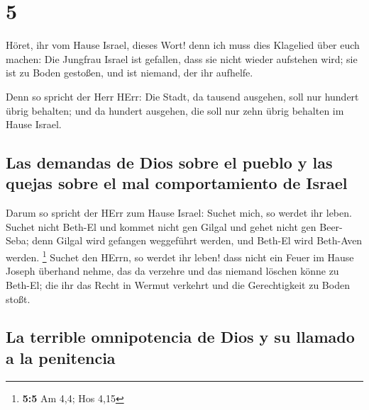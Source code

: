 \hypertarget{section-4}{%
\section{5}\label{section-4}}

 Höret, ihr vom Hause Israel, dieses Wort! denn ich muss
dies Klagelied über euch machen:  Die Jungfrau Israel ist
gefallen, dass sie nicht wieder aufstehen wird; sie ist zu Boden
gestoßen, und ist niemand, der ihr aufhelfe.

 Denn so spricht der Herr HErr: Die Stadt, da tausend
ausgehen, soll nur hundert übrig behalten; und da hundert ausgehen, die
soll nur zehn übrig behalten im Hause Israel.

\hypertarget{las-demandas-de-dios-sobre-el-pueblo-y-las-quejas-sobre-el-mal-comportamiento-de-israel}{%
\subsection{Las demandas de Dios sobre el pueblo y las quejas sobre el
mal comportamiento de
Israel}\label{las-demandas-de-dios-sobre-el-pueblo-y-las-quejas-sobre-el-mal-comportamiento-de-israel}}

 Darum so spricht der HErr zum Hause Israel: Suchet mich,
so werdet ihr leben.  Suchet nicht Beth-El und kommet
nicht gen Gilgal und gehet nicht gen Beer-Seba; denn Gilgal wird
gefangen weggeführt werden, und Beth-El wird Beth-Aven werden.
\footnote{\textbf{5:5} Am 4,4; Hos 4,15}  Suchet den
HErrn, so werdet ihr leben! dass nicht ein Feuer im Hause Joseph
überhand nehme, das da verzehre und das niemand löschen könne zu
Beth-El;  die ihr das Recht in Wermut verkehrt und die
Gerechtigkeit zu Boden stoßt.

\hypertarget{la-terrible-omnipotencia-de-dios-y-su-llamado-a-la-penitencia}{%
\subsection{La terrible omnipotencia de Dios y su llamado a la
penitencia}\label{la-terrible-omnipotencia-de-dios-y-su-llamado-a-la-penitencia}}

